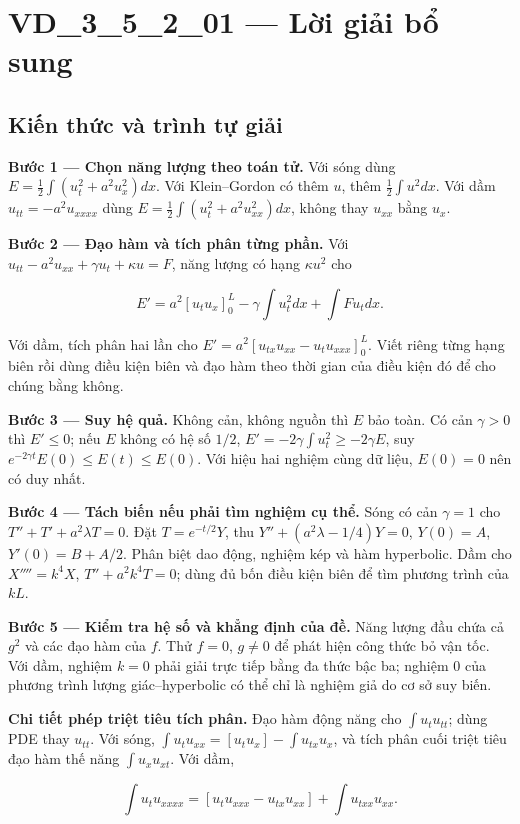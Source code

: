 \documentclass[10pt,a4paper]{article}
\begin{document}
\section*{VD\_3\_5\_2\_01 — Lời giải bổ sung}
\subsection*{Kiến thức và trình tự giải}
\textbf{Bước 1 — Chọn năng lượng theo toán tử.} Với sóng dùng $E=\frac12\int(u_t^2+a^2u_x^2)dx$. Với Klein–Gordon có thêm $u$, thêm $\frac12\int u^2dx$. Với dầm $u_{tt}=-a^2u_{xxxx}$ dùng $E=\frac12\int(u_t^2+a^2u_{xx}^2)dx$, không thay $u_{xx}$ bằng $u_x$.

\textbf{Bước 2 — Đạo hàm và tích phân từng phần.} Với $u_{tt}-a^2u_{xx}+\gamma u_t+\kappa u=F$, năng lượng có hạng $\kappa u^2$ cho


\[
E'=a^2[u_tu_x]_0^L-\gamma\int u_t^2dx+\int Fu_tdx.
\]


Với dầm, tích phân hai lần cho $E'=a^2[u_{tx}u_{xx}-u_tu_{xxx}]_0^L$. Viết riêng từng hạng biên rồi dùng điều kiện biên và đạo hàm theo thời gian của điều kiện đó để cho chúng bằng không.

\textbf{Bước 3 — Suy hệ quả.} Không cản, không nguồn thì $E$ bảo toàn. Có cản $\gamma>0$ thì $E'\le0$; nếu $E$ không có hệ số $1/2$, $E'=-2\gamma\int u_t^2\ge-2\gamma E$, suy $e^{-2\gamma t}E(0)\le E(t)\le E(0)$. Với hiệu hai nghiệm cùng dữ liệu, $E(0)=0$ nên có duy nhất.

\textbf{Bước 4 — Tách biến nếu phải tìm nghiệm cụ thể.} Sóng có cản $\gamma=1$ cho $T''+T'+a^2\lambda T=0$. Đặt $T=e^{-t/2}Y$, thu $Y''+(a^2\lambda-1/4)Y=0$, $Y(0)=A$, $Y'(0)=B+A/2$. Phân biệt dao động, nghiệm kép và hàm hyperbolic. Dầm cho $X''''=k^4X$, $T''+a^2k^4T=0$; dùng đủ bốn điều kiện biên để tìm phương trình của $kL$.

\textbf{Bước 5 — Kiểm tra hệ số và khẳng định của đề.} Năng lượng đầu chứa cả $g^2$ và các đạo hàm của $f$. Thử $f=0$, $g\ne0$ để phát hiện công thức bỏ vận tốc. Với dầm, nghiệm $k=0$ phải giải trực tiếp bằng đa thức bậc ba; nghiệm $0$ của phương trình lượng giác–hyperbolic có thể chỉ là nghiệm giả do cơ sở suy biến.

\textbf{Chi tiết phép triệt tiêu tích phân.} Đạo hàm động năng cho $\int u_tu_{tt}$; dùng PDE thay $u_{tt}$. Với sóng, $\int u_tu_{xx}=[u_tu_x]-\int u_{tx}u_x$, và tích phân cuối triệt tiêu đạo hàm thế năng $\int u_xu_{xt}$. Với dầm,


\[
\int u_tu_{xxxx}=[u_tu_{xxx}-u_{tx}u_{xx}]+\int u_{txx}u_{xx}.
\]
\end{document}
